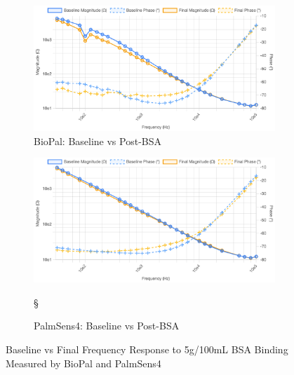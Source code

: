 \begin{figure}[H]
    \centering
    \begin{subfigure}{0.48\textwidth}   
        \includegraphics[width=\textwidth]{5g-100mL BioPal.png}
        \caption{BioPal: Baseline vs Post-BSA}
        \label{fig:5g_biopal}
    \end{subfigure}
    \hfill
    \begin{subfigure}{0.48\textwidth}
        \includegraphics[width=\textwidth]{PalmSens5g.png}
        \caption{PalmSens4: Baseline vs Post-BSA}
        \label{fig:5g_palmsens}§
    \end{subfigure}
    \caption{Baseline vs Final Frequency Response to 5g/100mL BSA Binding Measured by BioPal and PalmSens4}
    \label{fig:5g_bsa_comparison_final}
\end{figure}

